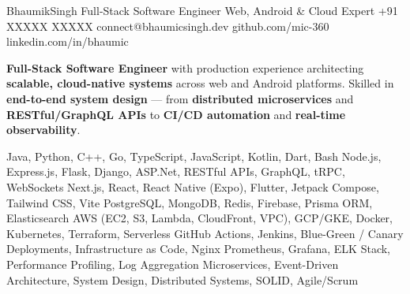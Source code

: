 \documentclass{bhaumic}
\begin{document}
\makeheader
  {Bhaumik}{Singh}
  {Full-Stack Software Engineer \textbar{} Web, Android \& Cloud Expert}
  {+91 XXXXX XXXXX}
  {connect@bhaumicsingh.dev}
  {github.com/mic-360}
  {linkedin.com/in/bhaumic}


\begin{resumesummary}
\textbf{Full-Stack Software Engineer} with production experience architecting
\textbf{scalable, cloud-native systems} across web and Android platforms.
Skilled in \textbf{end-to-end system design} — from \textbf{distributed microservices}
and \textbf{RESTful/GraphQL APIs} to \textbf{CI/CD automation} and \textbf{real-time observability}.
\end{resumesummary}


\begin{skilltable}
    {Java, Python, C++, Go, TypeScript, JavaScript, Kotlin, Dart, Bash}
    {Node.js, Express.js, Flask, Django, ASP.Net, RESTful APIs, GraphQL, tRPC, WebSockets}
    {Next.js, React, React Native (Expo), Flutter, Jetpack Compose, Tailwind CSS, Vite}
    {PostgreSQL, MongoDB, Redis, Firebase, Prisma ORM, Elasticsearch}
    {AWS (EC2, S3, Lambda, CloudFront, VPC), GCP/GKE, Docker, Kubernetes, Terraform, Serverless}
    {GitHub Actions, Jenkins, Blue-Green / Canary Deployments, Infrastructure as Code, Nginx}
    {Prometheus, Grafana, ELK Stack, Performance Profiling, Log Aggregation}
    {Microservices, Event-Driven Architecture, System Design, Distributed Systems, SOLID, Agile/Scrum}
\end{skilltable}


\end{document}
